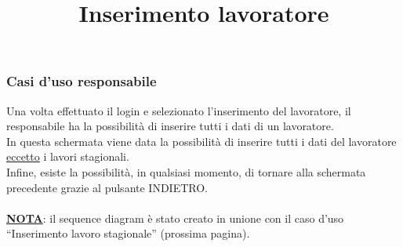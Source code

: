 \documentclass[a4paper,11pt]{article}
\begin{document}
\subsubsection{Casi d'uso responsabile}
\begin{center}
	\title{\textbf{Inserimento lavoratore}}
	\maketitle
\end{center}
Una volta effettuato il login e selezionato l'inserimento del lavoratore, il responsabile ha la possibilità di inserire tutti i dati di un lavoratore.\\
In questa schermata viene data la possibilità di inserire tutti i dati del lavoratore \underline{eccetto} i lavori stagionali.\\
Infine, esiste la possibilità, in qualsiasi momento, di tornare alla schermata precedente grazie al pulsante INDIETRO.\\\:\\
\underline{\textbf{NOTA}}: il sequence diagram è stato creato in unione con il caso d'uso ``Inserimento lavoro stagionale'' (prossima pagina).
\end{document}
